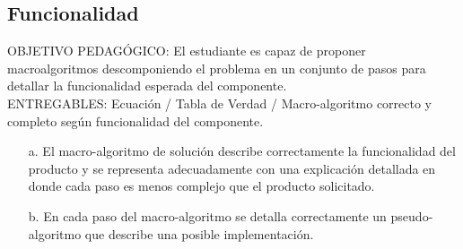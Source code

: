 \subsection{Funcionalidad}
\scriptsize
	\begin{tcolorbox}[enhanced,title=PRODUCTO DE CALIDAD:,colframe=colorA1,colback=colorA2,arc=0mm,colbacktitle=white,fonttitle=\bfseries,coltitle=white,attach boxed title to top left={xshift=3.2mm,yshift=-0.50mm},boxed title style={skin=enhancedfirst jigsaw,size=small,arc=0mm,bottom=1mm,interior style={fill=none,top color=color2,bottom color=color2},,boxrule=0pt},boxrule=0pt]
		OBJETIVO PEDAGÓGICO: El estudiante es capaz de proponer macroalgoritmos descomponiendo el problema en un conjunto de pasos para detallar la funcionalidad esperada del componente. \\
		ENTREGABLES: Ecuación / Tabla de Verdad / Macro-algoritmo correcto y completo según funcionalidad del componente.
		\begin{enumerate}
			\item[a.] El macro-algoritmo de solución describe correctamente la funcionalidad del producto y se representa adecuadamente con una explicación detallada en donde cada paso es menos complejo que el producto solicitado. 
			\item[b.] En cada paso del macro-algoritmo se detalla correctamente un pseudo-algoritmo que describe una posible implementación.
		\end{enumerate}
	\end{tcolorbox}

